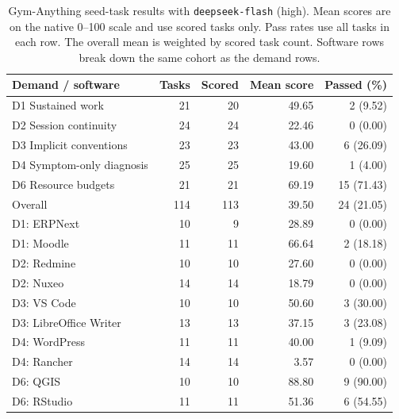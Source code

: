 \documentclass{article} %
\begin{document}
	\begin{table}[htbp]
		\centering
		\caption{Gym-Anything seed-task results with \texttt{deepseek-flash}
			(high). Mean scores are on the native 0--100 scale and use scored
			tasks only. Pass rates use all tasks in each row. The overall mean
			is weighted by scored task count. Software rows break down the same
			cohort as the demand rows.}
		\label{tab:gym-anything-deepseek-results}
		\small
		\renewcommand{\arraystretch}{1.15}
		\begin{tabular}{@{}lrrrr@{}}
			\toprule
			Demand / software & Tasks & Scored & Mean score & Passed (\%) \\
			\midrule
			D1 Sustained work & 21 & 20 & 49.65 & 2 (9.52) \\
			D2 Session continuity & 24 & 24 & 22.46 & 0 (0.00) \\
			D3 Implicit conventions & 23 & 23 & 43.00 & 6 (26.09) \\
			D4 Symptom-only diagnosis & 25 & 25 & 19.60 & 1 (4.00) \\
			D6 Resource budgets & 21 & 21 & 69.19 & 15 (71.43) \\
			\midrule
			Overall & 114 & 113 & 39.50 & 24 (21.05) \\
			\midrule
			D1: ERPNext & 10 & 9 & 28.89 & 0 (0.00) \\
			D1: Moodle & 11 & 11 & 66.64 & 2 (18.18) \\
			D2: Redmine & 10 & 10 & 27.60 & 0 (0.00) \\
			D2: Nuxeo & 14 & 14 & 18.79 & 0 (0.00) \\
			D3: VS Code & 10 & 10 & 50.60 & 3 (30.00) \\
			D3: LibreOffice Writer & 13 & 13 & 37.15 & 3 (23.08) \\
			D4: WordPress & 11 & 11 & 40.00 & 1 (9.09) \\
			D4: Rancher & 14 & 14 & 3.57 & 0 (0.00) \\
			D6: QGIS & 10 & 10 & 88.80 & 9 (90.00) \\
			D6: RStudio & 11 & 11 & 51.36 & 6 (54.55) \\
			\bottomrule
		\end{tabular}
	\end{table}
\end{document}
